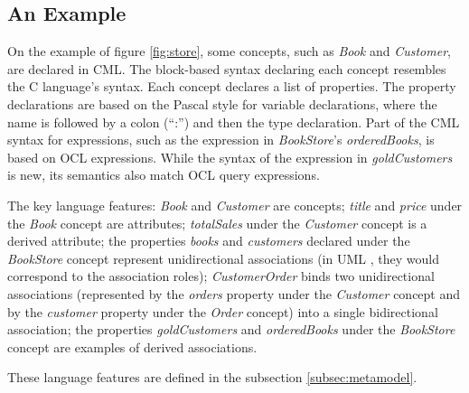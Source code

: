 \subsection{An Example}\label{subsec:example}

On the example of figure \ref{fig:store}, some concepts, such as \emph{Book} and \emph{Customer}, are declared in CML.
The block-based syntax declaring each concept resembles the C \cite{clang} language's syntax.
Each concept declares a list of properties.
The property declarations are based on the Pascal \cite{pascal} style for variable declarations,
where the name is followed by a colon (``:'') and then the type declaration.
Part of the CML syntax for expressions, such as the expression in \emph{BookStore}'s \emph{orderedBooks}, is based on OCL \cite{ocl} expressions.
While the syntax of the expression in \emph{goldCustomers} is new,
its semantics also match OCL \cite{ocl} query expressions.



The key language features:
\emph{Book} and \emph{Customer} are concepts;
\emph{title} and \emph{price} under the \emph{Book} concept are attributes;
\emph{totalSales} under the \emph{Customer} concept is a derived attribute;
the properties \emph{books} and \emph{customers}
declared under the \emph{BookStore} concept
represent unidirectional associations
(in UML \cite{uml}, they would correspond to the association roles);
\emph{CustomerOrder} binds two unidirectional associations
(represented by the \emph{orders} property under the \emph{Customer} concept
and by the \emph{customer} property under the \emph{Order} concept)
into a single bidirectional association;
the properties \emph{goldCustomers} and \emph{orderedBooks}
under the \emph{BookStore} concept are examples of derived associations.

These language features are defined in the subsection \ref{subsec:metamodel}.
